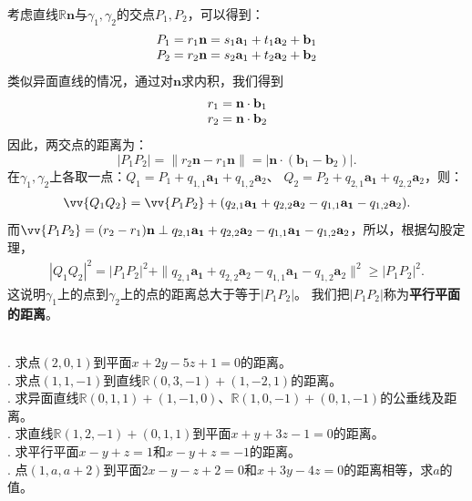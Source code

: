 \documentclass[12pt,UTF8,fontset=none]{ctexbook}
\begin{document}
考虑直线$\mathbb{R}\mathbf{n}$与$\gamma_1,\gamma_2$的交点$P_1,P_2$，可以得到：
$$
\begin{array}[]{c}
    P_1 = r_1\mathbf{n} = s_1\mathbf{a}_1 + t_1\mathbf{a}_2 + \mathbf{b}_1 \\
    P_2 = r_2\mathbf{n} = s_2\mathbf{a}_1 + t_2\mathbf{a}_2 + \mathbf{b}_2 
\end{array} 
$$
类似异面直线的情况，通过对$\mathbf{n}$求内积，我们得到
$$
\begin{array}[]{c}
    r_1 = \mathbf{n}\cdot\mathbf{b}_1 \\
    r_2 = \mathbf{n}\cdot\mathbf{b}_2 
\end{array}
$$
因此，两交点的距离为：
$$ |P_1P_2| = \| r_2\mathbf{n} - r_1\mathbf{n}\| = |\mathbf{n}\cdot(\mathbf{b}_1 - \mathbf{b}_2)|. $$
在$\gamma_1,\gamma_2$上各取一点：$Q_1 = P_1 + q_{1,1}\mathbf{a_1} + q_{1,2}\mathbf{a}_2$、
$Q_2 = P_2 + q_{2,1}\mathbf{a_1} + q_{2,2}\mathbf{a}_2$，则：
\begin{align*}
    \vv{Q_1Q_2} = \vv{P_1P_2}  + (q_{2,1}\mathbf{a_1} + q_{2,2}\mathbf{a}_2 - q_{1,1}\mathbf{a_1} - q_{1,2}\mathbf{a}_2).  
\end{align*}
而$\vv{P_1P_2} = (r_2 - r_1)\mathbf{n} \perp q_{2,1}\mathbf{a_1} + q_{2,2}\mathbf{a}_2 - q_{1,1}\mathbf{a_1} - q_{1,2}\mathbf{a}_2$，所以，根据勾股定理，
\begin{align*}
    |Q_1Q_2|^2 = |P_1P_2|^2 + \|q_{2,1}\mathbf{a_1} + q_{2,2}\mathbf{a}_2 - q_{1,1}\mathbf{a_1} - q_{1,2}\mathbf{a}_2\|^2 \geqslant |P_1P_2|^2.  
\end{align*}
这说明$\gamma_1$上的点到$\gamma_2$上的点的距离总大于等于$|P_1P_2|$。
我们把$|P_1P_2|$称为\textbf{平行平面的距离}。

\begin{xt}
    \mbox{} \\
    . 求点$(2,0,1)$到平面$x +2y - 5z + 1 = 0$的距离。\\
    . 求点$(1,1,-1)$到直线$\mathbb{R}(0,3,-1) + (1,-2,1)$的距离。\\
    . 求异面直线$\mathbb{R}(0,1,1)+(1,-1,0)$、$\mathbb{R}(1,0,-1)+(0,1,-1)$的公垂线及距离。\\
    . 求直线$\mathbb{R}(1,2,-1) + (0,1,1)$到平面$x + y + 3z - 1 = 0$的距离。\\
    . 求平行平面$x-y+z=1$和$x-y+z=-1$的距离。\\
    . 点$(1,a,a+2)$到平面$2x - y - z + 2 = 0$和$x + 3y - 4z = 0$的距离相等，求$a$的值。
\end{xt}
\end{document}
